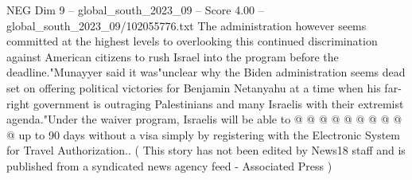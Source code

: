\begin{textsample}{NEG Dim 9 – global\_south\_2023\_09 – Score 4.00 – global\_south\_2023\_09/102055776.txt}
The administration however seems committed at the highest levels to overlooking this continued discrimination against American citizens to rush Israel into the program before the deadline."Munayyer said it was"unclear why the Biden administration seems dead set on offering political victories for Benjamin Netanyahu at a time when his far-right government is outraging Palestinians and many Israelis with their extremist agenda."Under the waiver program, Israelis will be able to @ @ @ @ @ @ @ @ @ @ up to 90 days without a visa simply by registering with the Electronic System for Travel Authorization.. ( This story has not been edited by News18 staff and is published from a syndicated news agency feed - Associated Press )

\end{textsample}
